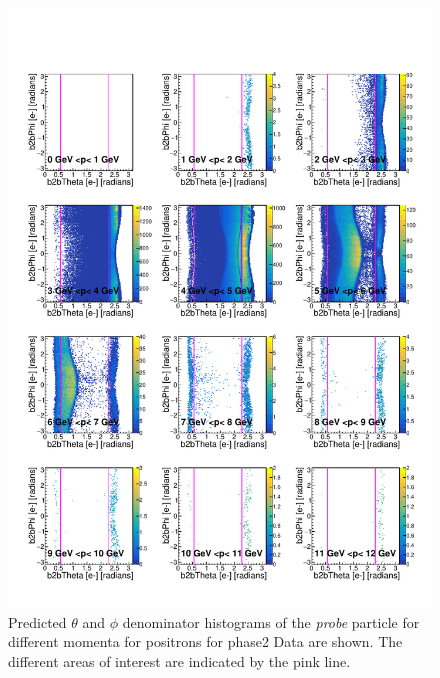 \documentclass[a4paper,11pt,twosided,final,german,openbib,pdftex,listof=totoc,bibliography=totoc]{scrbook}
\begin{document}
\begin{appendix}
\begin{figure}[h!]
	\includegraphics[width=\textwidth]{Plots/RTPMepD_Data.pdf}
	\caption[Denominator $\theta$-$\phi$ Positron Momentum Phase2 Data]{Predicted $\theta$ and $\phi$ denominator histograms of the \textit{probe} particle for different momenta for positrons for phase2 Data are shown. The different areas of interest are indicated by the pink line.}
	\label{plt:RTPMepD_Data}
\end{figure}







\end{appendix}
\end{document}

